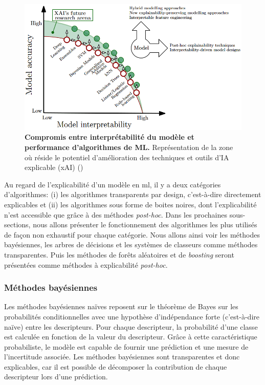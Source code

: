 \begin{figure}[htbp]
 \centering
 \includegraphics[width=1\textwidth]{figures/xai-research.png}
 \caption[Compromis entre interprétabilité et performances des algo de ML]{\textbf{Compromis entre interprétabilité du modèle et performance d'algorithmes de ML.} Représentation de la zone où réside le potentiel d'amélioration des techniques et outils d'IA explicable (xAI) (\cite{arrieta_explainable_2019})}
 \label{fig:xai-research}
\end{figure}

Au regard de l'explicabilité d'un modèle en \gls{ml}, il y a deux catégories d'algorithmes: (i) les algorithmes transparents par design, c'est-à-dire directement explicables et (ii) les algorithmes sous forme de boites noires, dont l'explicabilité n'est accessible que grâce à des méthodes \textit{post-hoc}. Dans les prochaines sous-sections, nous allons présenter le fonctionnement des algorithmes les plus utilisés de façon non exhaustif pour chaque catégorie. Nous allons ainsi voir les méthodes bayésiennes, les arbres de décisions et les systèmes de classeurs comme méthodes transparentes. Puis les méthodes de forêts aléatoires et de \textit{boosting} seront présentées comme méthodes à explicabilité \textit{post-hoc}.

\subsubsection{Méthodes bayésiennes}
Les méthodes bayésiennes naïves reposent sur le théorème de Bayes sur les probabilités conditionnelles avec une hypothèse d'indépendance forte (c'est-à-dire naïve) entre les descripteurs. Pour chaque descripteur, la probabilité d'une classe est calculée en fonction de la valeur du descripteur. Grâce à cette caractéristique probabiliste, le modèle est capable de fournir une prédiction et une mesure de l'incertitude associée. Les méthodes bayésiennes sont transparentes et donc explicables, car il est possible de décomposer la contribution de chaque descripteur lors d'une prédiction.

